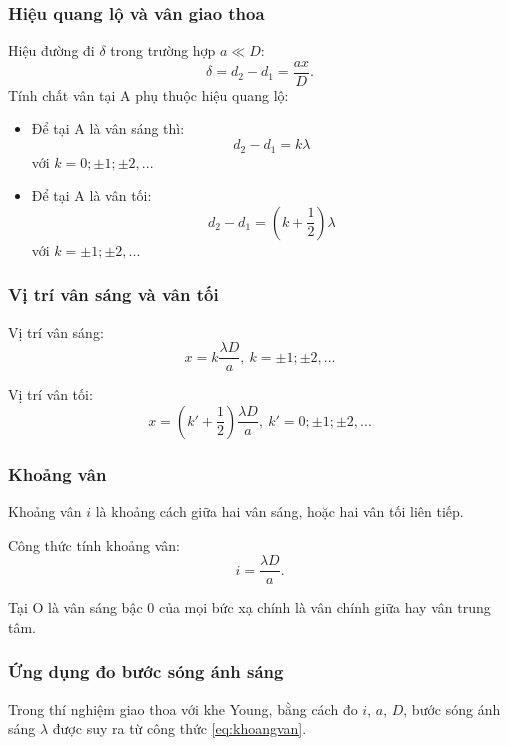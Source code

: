\subsubsection{Hiệu quang lộ và vân giao thoa}
	 Hiệu đường đi $\delta$ trong trường hợp $a\ll D$:
		\begin{equation}
			\delta = d_2-d_1=\dfrac{ax}{D}.  
		\end{equation}
	Tính chất vân tại A phụ thuộc hiệu quang lộ:
	\begin{itemize}
		\item Để tại A là vân sáng thì: $$d_2-d_1=k\lambda$$ với $k=0; \pm 1; \pm 2,...$
	 	\item Để tại A là vân tối: $$d_2-d_1=\left(k+\dfrac{1}{2}\right) \lambda$$ với $k= \pm 1; \pm 2,...$
	\end{itemize}
\subsubsection{Vị trí vân sáng và vân tối}
	Vị trí vân sáng:
	\begin{equation}
		 x=k\dfrac{\lambda D}{a},\ k=\pm 1; \pm 2,...
	 \end{equation}
	 
	Vị trí vân tối: 
	\begin{equation}
		x=\left(k'+\dfrac{1}{2}\right) \dfrac{\lambda D}{a},\ k'=0; \pm 1; \pm 2,... 
	\end{equation}


\subsubsection{Khoảng vân}
Khoảng vân $i$ là khoảng cách giữa hai vân sáng, hoặc hai vân tối liên tiếp.

Công thức tính khoảng vân: 
\begin{equation}\label{eq:khoangvan}	
	i=\dfrac{\lambda D}{a}.	
\end{equation}
	
Tại O là vân sáng bậc 0 của mọi bức xạ chính là vân chính giữa hay vân trung tâm.

\subsubsection {Ứng dụng đo bước sóng ánh sáng}
Trong thí nghiệm giao thoa với khe Young, bằng cách đo $i$, $a$, $D$, bước sóng ánh sáng $\lambda$ được suy ra từ công thức \eqref{eq:khoangvan}.
